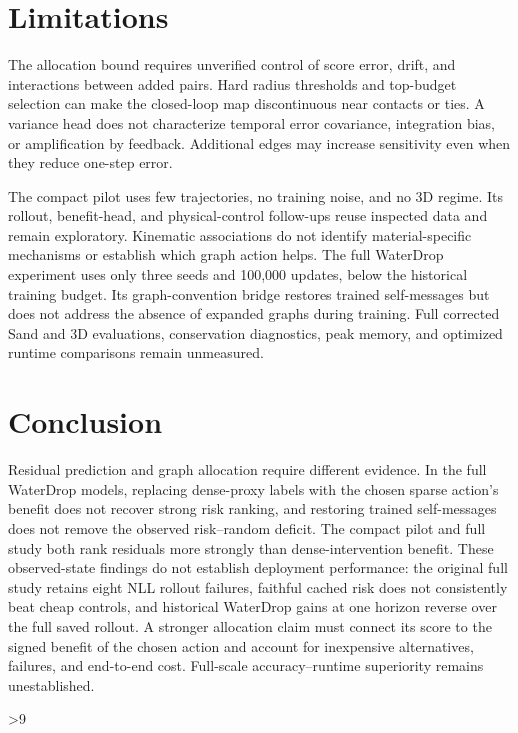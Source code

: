 \section{Limitations}
The allocation bound requires unverified control of score error, drift, and interactions between added pairs. Hard radius thresholds and top-budget selection can make the closed-loop map discontinuous near contacts or ties. A variance head does not characterize temporal error covariance, integration bias, or amplification by feedback. Additional edges may increase sensitivity even when they reduce one-step error.

The compact pilot uses few trajectories, no training noise, and no 3D regime. Its rollout, benefit-head, and physical-control follow-ups reuse inspected data and remain exploratory. Kinematic associations do not identify material-specific mechanisms or establish which graph action helps. The full WaterDrop experiment uses only three seeds and 100,000 updates, below the historical training budget. Its graph-convention bridge restores trained self-messages but does not address the absence of expanded graphs during training. Full corrected Sand and 3D evaluations, conservation diagnostics, peak memory, and optimized runtime comparisons remain unmeasured.

\section{Conclusion}
Residual prediction and graph allocation require different evidence. In the full WaterDrop models, replacing dense-proxy labels with the chosen sparse action's benefit does not recover strong risk ranking, and restoring trained self-messages does not remove the observed risk--random deficit. The compact pilot and full study both rank residuals more strongly than dense-intervention benefit. These observed-state findings do not establish deployment performance: the original full study retains eight NLL rollout failures, faithful cached risk does not consistently beat cheap controls, and historical WaterDrop gains at one horizon reverse over the full saved rollout. A stronger allocation claim must connect its score to the signed benefit of the chosen action and account for inexpensive alternatives, failures, and end-to-end cost. Full-scale accuracy--runtime superiority remains unestablished.

\clearpage
{}
\ifnum\value{page}>9
  \PackageError{research-revision}{Main text exceeds the eight-page limit}{Shorten the main text before submission.}
\fi
